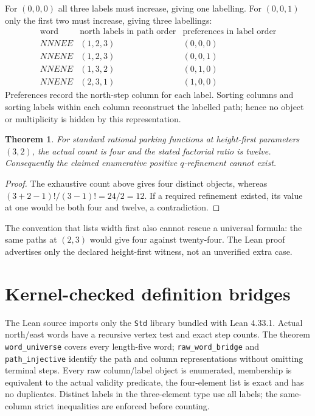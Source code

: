 \documentclass[10pt,a4paper]{article}
\newtheorem{theorem}{Theorem}
\begin{document}
For $(0,0,0)$ all three labels must increase, giving one labelling. For
$(0,0,1)$ only the first two must increase, giving three labellings:
\[
\begin{array}{c|c|c}
\text{word}&\text{north labels in path order}&\text{preferences in label order}\\\hline
NNNEE&(1,2,3)&(0,0,0)\\
NNENE&(1,2,3)&(0,0,1)\\
NNENE&(1,3,2)&(0,1,0)\\
NNENE&(2,3,1)&(1,0,0)
\end{array}
\]
Preferences record the north-step column for each label. Sorting columns and
sorting labels within each column reconstruct the labelled path; hence no
object or multiplicity is hidden by this representation.

\begin{theorem}
For standard rational parking functions at height-first parameters $(3,2)$,
the actual count is four and the stated factorial ratio is twelve.
Consequently the claimed enumerative positive $q$-refinement cannot exist.
\end{theorem}
\begin{proof}
The exhaustive count above gives four distinct objects, whereas
$(3+2-1)!/(3-1)!=24/2=12$. If a required refinement existed, its value at one
would be both four and twelve, a contradiction.
\end{proof}
The convention that lists width first also cannot rescue a universal formula:
the same paths at $(2,3)$ would give four against twenty-four. The Lean proof
advertises only the declared height-first witness, not an unverified extra case.

\section{Kernel-checked definition bridges}
The Lean source imports only the \texttt{Std} library bundled with Lean 4.33.1.
Actual north/east words have a recursive vertex test and exact step counts.
The theorem \texttt{word\_universe} covers every length-five word;
\texttt{raw\_word\_bridge} and \texttt{path\_injective} identify the path and
column representations without omitting terminal steps.
Every raw column/label object is enumerated, membership is equivalent to the
actual validity predicate, the four-element list is exact and has no duplicates.
Distinct labels in the three-element type use all labels; the same-column
strict inequalities are enforced before counting.
\end{document}

